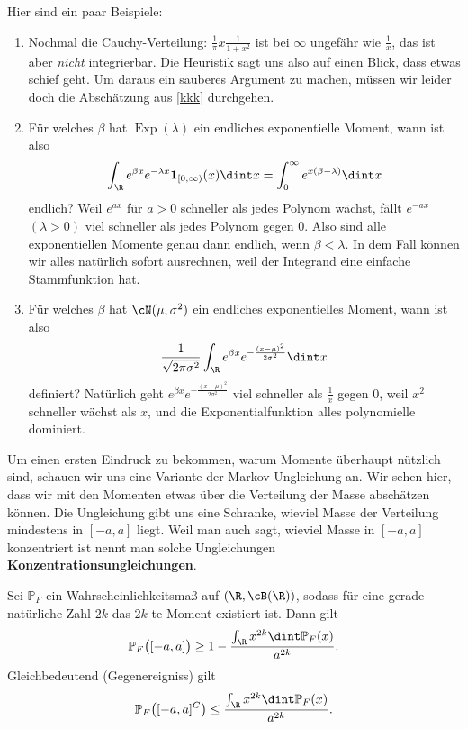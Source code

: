 \begin{bem}
	Hier sind ein paar Beispiele:
	\begin{enumerate}[label=(\roman*)]
		\item Nochmal die Cauchy-Verteilung: $\frac{1}{\pi} x \frac{1}{1+x^2}$ ist bei $\infty$ ungefähr wie $\frac{1}{x}$, das ist aber \textit{nicht} integrierbar. Die Heuristik sagt uns also auf einen Blick, dass etwas schief geht. Um daraus ein sauberes Argument zu machen, m\"ussen wir leider doch die Absch\"atzung aus \ref{kkk} durchgehen.	
		\item Für welches $\beta$ hat $\operatorname{Exp}(\lambda)$ ein endliches exponentielle Moment, wann ist also 
		\[\int_{\R} e^{\beta x} e^{-\lambda x} \mathbf{1}_{[0,\infty)}(x) \dint x = \int_{0}^{\infty} e^{x(\beta - \lambda)} \dint x \]
		endlich? Weil $e^{ax}$ f\"ur $a>0$ schneller als jedes Polynom wächst, fällt $e^{-a x}$ $(\lambda > 0)$ viel schneller als jedes Polynom gegen $0$. Also sind alle exponentiellen Momente genau dann endlich, wenn $\beta < \lambda$. In dem Fall k\"onnen wir alles nat\"urlich sofort ausrechnen, weil der Integrand eine einfache Stammfunktion hat.
		\item Für welches $\beta$ hat $\cN(\mu, \sigma^2)$ ein endliches exponentielles Moment, wann ist also
		\[ \frac{1}{\sqrt{2 \pi \sigma^2}} \int_{\R} e^{\beta x} e^{-\frac{(x-\mu)^2}{2\sigma^2}} \dint x \] definiert?
		Nat\"urlich geht $e^{\beta x} e^{-\frac{(x-\mu)^2}{2\sigma^2}}$ viel schneller als $\frac{1}{x}$ gegen 0, weil $x^2$ schneller wächst als $x$, und die Exponentialfunktion alles polynomielle dominiert.
	\end{enumerate}
\end{bem}

Um einen ersten Eindruck zu bekommen, warum Momente \"uberhaupt n\"utzlich sind, schauen wir uns eine Variante der Markov-Ungleichung an. Wir sehen hier, dass wir mit den Momenten etwas \"uber die Verteilung der Masse absch\"atzen k\"onnen. Die Ungleichung gibt uns eine Schranke, wieviel Masse der Verteilung mindestens in $[-a,a]$ liegt. Weil man auch sagt, \glqq wieviel Masse in $[-a,a]$ konzentriert ist\grqq{} nennt man solche Ungleichungen \textbf{Konzentrationsungleichungen}.

\begin{prop} \label{MarkovPoly}
	Sei $\mathbb{P}_F$ ein Wahrscheinlichkeitsmaß auf $(\R, \cB(\R))$, sodass für eine gerade nat\"urliche Zahl $2k$ das $2k$-te Moment existiert ist. Dann gilt
	\[ \mathbb{P}_F\big([-a,a]\big) \geq 1 - \frac{\int_{\R} x^{2k} \dint \mathbb{P}_F(x) }{a^{2k}}. \]
	Gleichbedeutend (Gegenereigniss) gilt 
	\[ \mathbb{P}_F\big([-a,a]^C\big) \leq  \frac{\int_{\R} x^{2k} \dint \mathbb{P}_F(x) }{a^{2k}}. \]
\end{prop}

